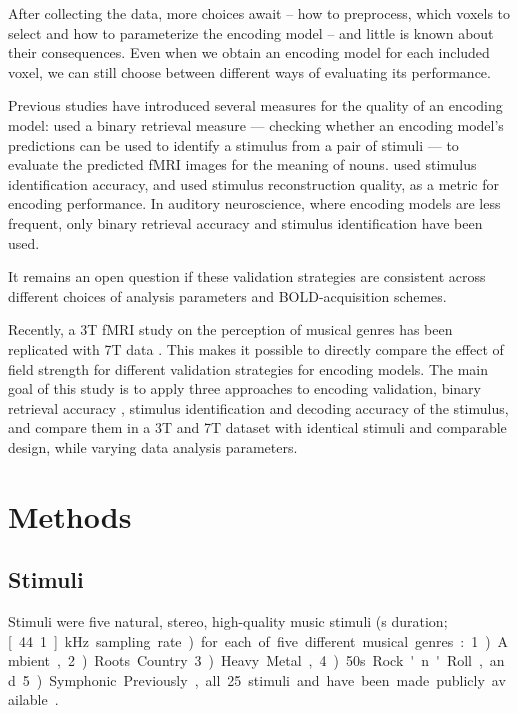 After collecting the data, more choices await -- how to preprocess, which
voxels to select and how to parameterize the encoding model -- and little is known about their
consequences. Even when we obtain an encoding model for each included voxel,
we can still choose between different ways of evaluating its performance.

Previous studies have introduced several measures for the quality of
an encoding model: \citet{ML08} used a binary retrieval measure --- checking
whether an encoding model's predictions can be used to identify a stimulus from
a pair of stimuli --- to evaluate the predicted f{MRI} images for the meaning
of nouns. \citet{KG+08} used stimulus identification accuracy, and \citet{NG09} used
stimulus reconstruction quality, as a metric for encoding performance.
In auditory neuroscience, where encoding models are less frequent, only binary retrieval
accuracy \citep{CTK+2012} and stimulus identification \citep{SF14} have been
used. 

It remains an open question if these validation strategies are consistent
across different choices of analysis parameters and BOLD-acquisition schemes.

Recently, a 3T f{MRI} study on the perception of musical genres
\citep{CTK+2012} has been replicated with 7T data \citep{HDH+2015}. This makes
it possible to directly compare the effect of field strength for different 
validation strategies for encoding models. The main goal of this
study is to apply three approaches to encoding validation, binary retrieval
accuracy \citep{ML08}, stimulus identification \citep{KG+08,SF14} and
decoding accuracy of the stimulus, and compare them in a 3T
and 7T dataset with identical stimuli and comparable design, while varying
data analysis parameters.

\section*{Methods}

\subsection*{Stimuli}

Stimuli were five natural, stereo, high-quality music stimuli (\unit[6]{s}
duration; \unit[44.1]{kHz} sampling rate) for each of five different musical
genres: 1) Ambient, 2) Roots Country 3) Heavy Metal, 4) 50s Rock'n'Roll, and 5)
Symphonic. Previously, all 25 stimuli and have been made publicly available
\citep{HDH+2015}.


